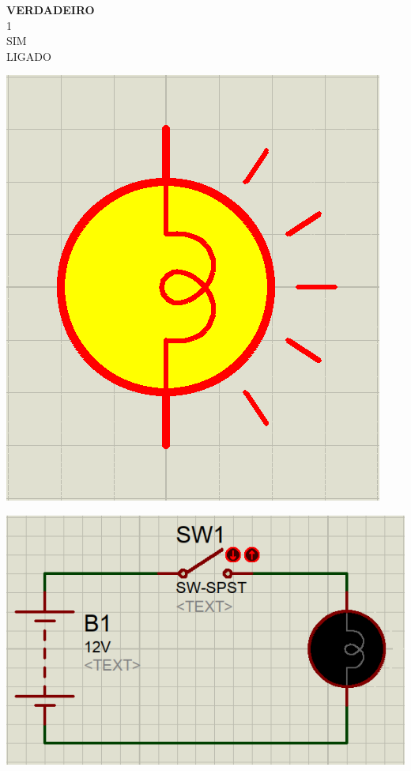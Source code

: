 \begin{multicols}{2}
\vfill
\columnbreak

{\large \textbf{VERDADEIRO}\\	
	1\\	
	SIM\\	
	LIGADO\
}

\begin{center}

	\includegraphics[height=.7\textheight]{./IMG/VERDADEIRO.png}
\end{center}

\vfill
\columnbreak

\begin{center}
	\includegraphics[width=.9\linewidth]{./IMG/Screenshot_20231216_190844.png}
\end{center}


\end{multicols}
